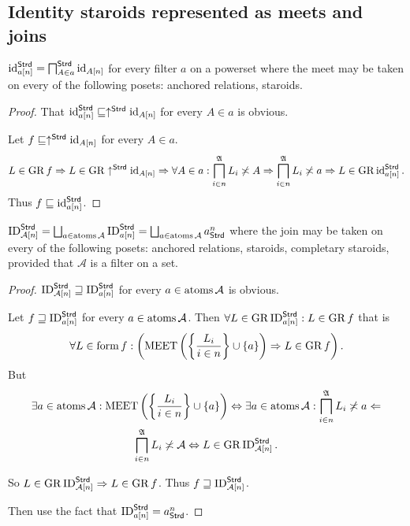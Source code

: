 \subsection{Identity staroids represented as meets and joins}
\begin{prop}
$\operatorname{id}_{a[n]}^{\mathsf{Strd}}=\bigsqcap_{A\in a}^{\mathsf{Strd}}\operatorname{id}_{A[n]}$
for every filter $a$ on a powerset where the meet may be taken on
every of the following posets: anchored relations, staroids.\end{prop}
\begin{proof}
That $\operatorname{id}_{a[n]}^{\mathsf{Strd}}\sqsubseteq\uparrow^{\mathsf{Strd}}\operatorname{id}_{A[n]}$
for every $A\in a$ is obvious.

Let $f\sqsubseteq\uparrow^{\mathsf{Strd}}\operatorname{id}_{A[n]}$ for every $A\in a$.
\[
L\in\operatorname{GR} f\Rightarrow L\in\operatorname{GR}\uparrow^{\mathsf{Strd}}\operatorname{id}_{A[n]}\Rightarrow\forall A\in a:\bigsqcap_{i\in n}^{\mathfrak{A}}L_{i}\not\asymp A\Rightarrow\bigsqcap_{i\in n}^{\mathfrak{A}}L_{i}\not\asymp a\Rightarrow L\in\operatorname{GR}\operatorname{id}_{a[n]}^{\mathsf{Strd}}.
\]
Thus $f\sqsubseteq\operatorname{id}_{a[n]}^{\mathsf{Strd}}$.\end{proof}
\begin{prop}
$\operatorname{ID}_{\mathcal{A}[n]}^{\mathsf{Strd}}=\bigsqcup_{a\in\operatorname{atoms}\mathcal{A}}\operatorname{ID}_{a[n]}^{\mathsf{Strd}}=\bigsqcup_{a\in\operatorname{atoms}\mathcal{A}}a_{\mathsf{Strd}}^{n}$
where the join may be taken on every of the following posets: anchored
relations, staroids, completary staroids, provided that $\mathcal{A}$
is a filter on a set.\end{prop}
\begin{proof}
$\operatorname{ID}_{\mathcal{A}[n]}^{\mathsf{Strd}}\sqsupseteq\operatorname{ID}_{a[n]}^{\mathsf{Strd}}$
for every $a\in\operatorname{atoms}\mathcal{A}$ is obvious.

Let $f\sqsupseteq\operatorname{ID}_{a[n]}^{\mathsf{Strd}}$ for every $a\in\operatorname{atoms}\mathcal{A}$.
Then $\forall L\in\operatorname{GR}\operatorname{ID}_{a[n]}^{\mathsf{Strd}}:L\in\operatorname{GR} f$ that is
\[
\forall L\in\operatorname{form} f:\left(\operatorname{MEET}\left(\left\{ \frac{L_{i}}{i\in n}\right\}\cup\{a\}\right)\Rightarrow L\in\operatorname{GR} f\right).
\]
But
\begin{multline*}
\exists a\in\operatorname{atoms}\mathcal{A}:\operatorname{MEET}\left(\left\{ \frac{L_{i}}{i\in n}\right\}\cup\{a\}\right)\Leftrightarrow\exists a\in\operatorname{atoms}\mathcal{A}:\bigsqcap_{i\in n}^{\mathfrak{A}}L_{i}\not\asymp a\Leftarrow\\
\bigsqcap_{i\in n}^{\mathfrak{A}}L_{i}\not\asymp\mathcal{A}\Leftrightarrow L\in\operatorname{GR}\operatorname{ID}_{\mathcal{A}[n]}^{\mathsf{Strd}}.
\end{multline*}


So $L\in\operatorname{GR}\operatorname{ID}_{\mathcal{A}[n]}^{\mathsf{Strd}}\Rightarrow L\in\operatorname{GR} f$.
Thus $f\sqsupseteq\operatorname{ID}_{\mathcal{A}[n]}^{\mathsf{Strd}}$.

Then use the fact that $\operatorname{ID}_{a[n]}^{\mathsf{Strd}}=a_{\mathsf{Strd}}^{n}$.\end{proof}
